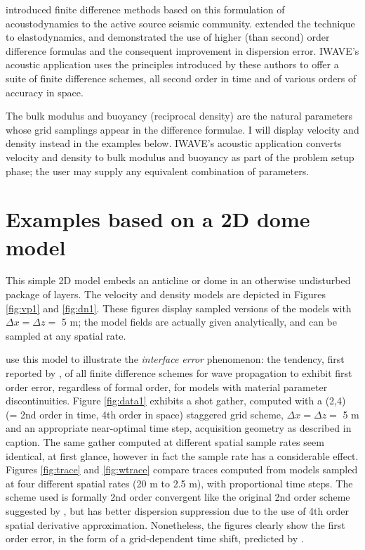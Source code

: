\cite{Vir:84} introduced finite difference methods based on this
formulation of acoustodynamics to the active source seismic
community. \cite{Vir:86} extended the technique to elastodynamics, and
\cite{Lev:88} demonstrated the use of higher (than second) order
difference formulas and the consequent improvement in dispersion
error.  IWAVE's acoustic application uses the principles introduced by
these authors to offer a suite of finite difference schemes, all
second order in time and of various orders of accuracy in space.

The bulk modulus and buoyancy (reciprocal density) are the natural
parameters whose grid samplings appear in the difference formulae. I will
display velocity and density instead in the examples below. IWAVE's acoustic application
converts velocity and density to bulk modulus and buoyancy as part of
the problem setup phase; the user may supply any equivalent combination of parameters.

\section{Examples based on a 2D dome model}

This simple 2D model embeds an anticline or dome in an otherwise
undisturbed package of layers. The velocity and density models are
depicted in Figures \ref{fig:vp1} and \ref{fig:dn1}. These
figures display sampled versions of the models with $\Delta x = \Delta
z = $ 5 m; the model fields are actually given analytically, and can
be sampled at any spatial rate.

\cite{SymesVdovina:09} use this model to illustrate the {\em
  interface error} phenomenon: the tendency, first reported by
\cite{Brown:84}, of all finite difference schemes for wave
propagation to exhibit first order error, regardless of formal order,
for models with material parameter discontinuities. 
Figure \ref{fig:data1} exhibits a shot gather, computed with a (2,4) (= 2nd order in time,
4th order in space) staggered grid scheme, $\Delta
x = \Delta z = $ 5 m and an appropriate near-optimal time step, acquisition geometry as described in
caption. The same gather computed at different spatial sample rates
seem identical, at first glance, however in fact the sample rate has a considerable effect. Figures
\ref{fig:trace} and \ref{fig:wtrace} compare traces computed from models sampled
at four different spatial rates (20 m to 2.5 m), with proportional
time steps. The scheme used is formally 2nd order
convergent like the original 2nd order scheme suggested by
\cite{Vir:84}, but has better dispersion suppression due to the use of
4th order spatial derivative approximation. Nonetheless,
the figures clearly show the first order error, in the form of a
grid-dependent time shift, predicted by \cite{Brown:84}. 

